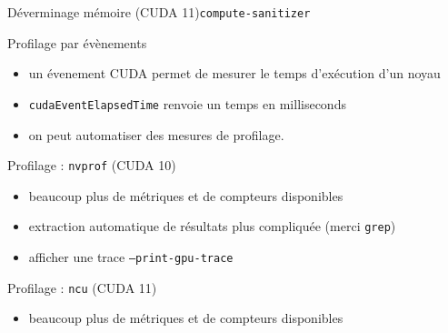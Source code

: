 \documentclass[11pt,mathserif]{beamer}
\newcommand{\argi}{\faLightbulbO}
\newcommand{\kontuz}{\faExclamationTriangle}
\newcommand{\pozik}{\faSmileO}
\newcommand{\triste}{\faFrownO}
\begin{document}
\begin{frame}{Déverminage mémoire (CUDA 11)}{\texttt{compute-sanitizer}}
  
\end{frame}

\begin{frame}{Profilage par évènements}
  \begin{itemize}[<+->]
    \item[\argi] un \og{}évenement\fg{} CUDA permet de mesurer le temps d'exécution d'un noyau
\begin{center}
  
\end{center}
   \item[\kontuz] \texttt{cudaEventElapsedTime} renvoie un temps en milliseconds
   \item[\pozik] on peut automatiser des mesures de profilage.
  \end{itemize}
\end{frame}

\begin{frame}{Profilage : \texttt{nvprof} (CUDA 10)}
  \begin{itemize}[<+->]
    \item[\pozik] beaucoup plus de métriques et de compteurs disponibles
    \item[\triste] extraction automatique de résultats plus compliquée (merci \texttt{grep})
    \item[\argi] afficher une trace {\tt --print-gpu-trace }
  \end{itemize}
\pause
\end{frame}

\begin{frame}{Profilage : \texttt{ncu} (CUDA 11)}
  \begin{itemize}[<+->]
    \item[\pozik] beaucoup plus de métriques et de compteurs disponibles
  \end{itemize}
\pause
\end{frame}
\end{document}
